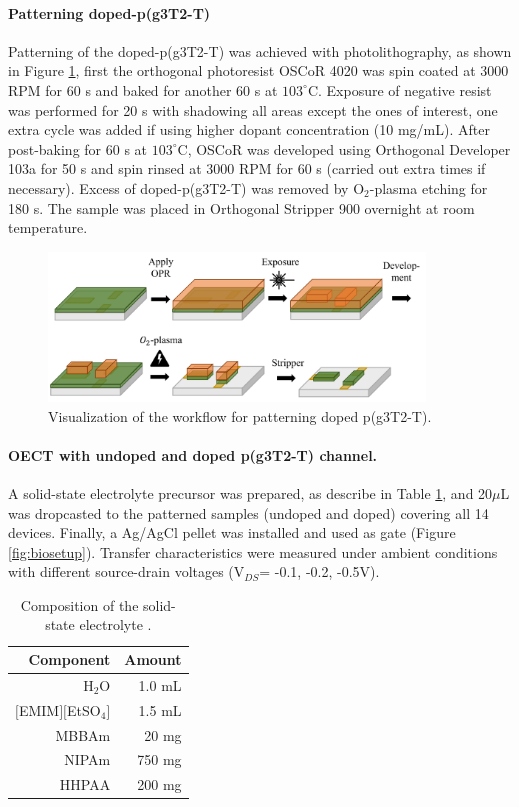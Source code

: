 \paragraph{Patterning doped-p(g3T2-T)}Patterning of the doped-p(g3T2-T) was achieved with photolithography, as shown in Figure \ref{fig:dopedpat}, first the orthogonal photoresist OSCoR 4020 was spin coated at 3000 RPM for 60 s and baked for another 60 s at $103^{\circ}$C. Exposure of negative resist was performed for 20 s with shadowing all areas except the ones of interest, one extra cycle was added if using higher dopant concentration (10 mg/mL). After post-baking for 60 s at $103^{\circ}$C, OSCoR was developed using Orthogonal Developer 103a for 50 s and spin rinsed at 3000 RPM for 60 s (carried out extra times if necessary). Excess of doped-p(g3T2-T) was removed by O$_{2}$-plasma etching for 180 s. The sample was placed in Orthogonal Stripper 900 overnight at room temperature.

\begin{figure}[ht]
	\centering
	\includegraphics[width=10cm]{Images/pdf/doped-patterning.pdf}
	\caption{Visualization of the workflow for patterning doped p(g3T2-T).}
	\label{fig:dopedpat}
\end{figure}

\paragraph{OECT with undoped and doped p(g3T2-T) channel.} A solid-state electrolyte precursor was prepared, as describe in Table \ref{tab:sse}, and 20$\mu$L was dropcasted to the patterned samples (undoped and doped) covering all 14 devices. Finally, a Ag/AgCl pellet was installed and used as gate (Figure \ref{fig:biosetup}). Transfer characteristics were measured under ambient conditions with different source-drain voltages (V$_{DS}$= -0.1, -0.2, -0.5V).

\begin{table}[h]
	\centering
	\caption{Composition of the solid-state electrolyte \cite{weissbachPhotopatternableSolidElectrolyte2022}.}
	\begin{tabular}{r r} \hline
		Component   & Amount \\ \hline
		H$_{2}$O	& 1.0 mL \\ 
		$[$EMIM$][$EtSO$_{4}]$   & 1.5 mL \\ 
		MBBAm   & 20 mg \\ 
		NIPAm   & 750 mg \\ 
		HHPAA   & 200 mg \\ \hline
	\end{tabular}
	\label{tab:sse}
\end{table}

